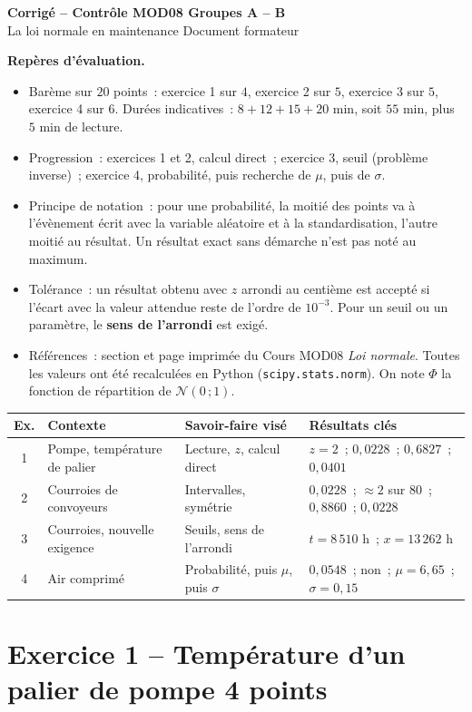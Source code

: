 \documentclass[a4paper,11pt]{article}
\newcommand{\LN}{Cours MOD08 \textit{Loi normale}}
\newcommand{\GRP}{A -- B}
\newcommand{\RECAP}{%
1 & Pompe, température de palier & Lecture, $z$, calcul direct & $z = 2$~; $0{,}0228$~; $0{,}6827$~; $0{,}0401$ \\
2 & Courroies de convoyeurs & Intervalles, symétrie & $0{,}0228$~; $\approx 2$ sur $80$~; $0{,}8860$~; $0{,}0228$ \\
3 & Courroies, nouvelle exigence & Seuils, sens de l'arrondi & $t = 8\,510$ h~; $x = 13\,262$ h \\
4 & Air comprimé & Probabilité, puis $\mu$, puis $\sigma$ & $0{,}0548$~; non~; $\mu = 6{,}65$~; $\sigma = 0{,}15$ \\
}
\begin{document}
\begin{tcolorbox}[colback=uimmblue, colframe=uimmblue, sharp corners, boxrule=0pt,
  left=14pt, right=14pt, top=8pt, bottom=8pt]
{\color{white}\LARGE\bfseries Corrigé -- Contrôle MOD08 \hfill Groupes \GRP}\\[3pt]
{\color{white}\large La loi normale en maintenance \hfill Document formateur}
\end{tcolorbox}

\begin{consigne}\small
\textbf{Repères d'évaluation.}
\begin{itemize}[leftmargin=12pt, itemsep=1pt, topsep=2pt]
  \item Barème sur $20$ points~: exercice 1 sur $4$, exercice 2 sur $5$, exercice 3 sur $5$, exercice 4 sur $6$. Durées indicatives~: $8 + 12 + 15 + 20$ min, soit $55$ min, plus $5$ min de lecture.
  \item Progression~: exercices 1 et 2, calcul direct~; exercice 3, seuil (problème inverse)~; exercice 4, probabilité, puis recherche de $\mu$, puis de $\sigma$.
  \item Principe de notation~: pour une probabilité, la moitié des points va à l'évènement écrit avec la variable aléatoire et à la standardisation, l'autre moitié au résultat. Un résultat exact sans démarche n'est pas noté au maximum.
  \item Tolérance~: un résultat obtenu avec $z$ arrondi au centième est accepté si l'écart avec la valeur attendue reste de l'ordre de $10^{-3}$. Pour un seuil ou un paramètre, le \textbf{sens de l'arrondi} est exigé.
  \item Références~: section et page imprimée du \LN{}. Toutes les valeurs ont été recalculées en Python (\texttt{scipy.stats.norm}). On note $\Phi$ la fonction de répartition de $\mathcal{N}(0\,;1)$.
\end{itemize}
\end{consigne}

\begin{center}\small
\renewcommand{\arraystretch}{1.2}
\begin{tabular}{clll}
\toprule
\textbf{Ex.} & \textbf{Contexte} & \textbf{Savoir-faire visé} & \textbf{Résultats clés} \\
\midrule
\RECAP
\bottomrule
\end{tabular}
\end{center}


\section{Exercice 1 -- Température d'un palier de pompe \hfill {\normalsize\color{uimmred}4 points}}
\end{document}
